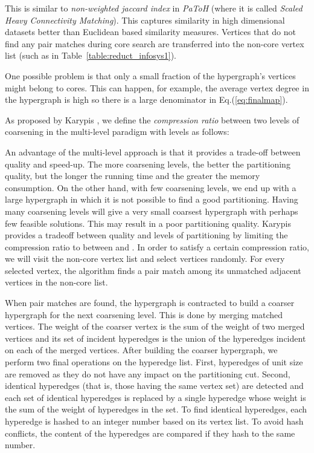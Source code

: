 \documentclass[twocolumn]{svjour3}          \smartqed
\begin{document}
This is similar to \textit{non-weighted jaccard index} in \textit{PaToH} (where it is called \emph{Scaled Heavy Connectivity Matching}). This captures similarity in high dimensional datasets better than Euclidean based similarity measures. Vertices that do not find any pair matches during core search are transferred into the non-core vertex list (such as  in Table~\ref{table:reduct_infosys1}).

One possible problem is that only a small fraction of the hypergraph's vertices might belong to cores. This can happen, for example, the average vertex degree in the hypergraph is high so there is a  large denominator in Eq.(\ref{eq:finalmap}). 

As proposed by Karypis \cite{karytech2002}, we define the \textit{compression ratio} between two levels of coarsening in the multi-level paradigm with  levels as follows:



An advantage of the multi-level approach is that it provides a trade-off between quality and speed-up. The more coarsening levels, the better the partitioning quality, but the longer the running time and the greater the memory consumption. On the other hand, with few coarsening levels, we end up with a large hypergraph in which it is not possible to find a good partitioning.  Having many coarsening levels will give a very small coarsest hypergraph with perhaps few feasible solutions.  This may result in a poor partitioning quality. Karypis \cite{karytech2002} provides a tradeoff between quality and levels of partitioning by limiting the compression ratio  to between  and  .  In order to satisfy a certain compression ratio, we will visit the non-core vertex list and select vertices randomly. For every selected vertex, the algorithm finds a pair match among its unmatched adjacent vertices in the non-core list.

When pair matches are found, the hypergraph is contracted to build a coarser hypergraph for the next coarsening level. This is done by merging matched vertices. The weight of the coarser vertex is the sum of the weight of two merged vertices and its set of incident hyperedges is the union of the hyperedges incident on each of the merged vertices. After building the coarser hypergraph, we perform two final operations on the hyperedge list. First, hyperedges of unit size are removed as they do not have any impact on the partitioning cut.  Second, identical hyperedges (that is, those having the same vertex set) are detected and each set of identical hyperedges is replaced by a single hyperedge whose weight is the sum of the weight of hyperedges in the set. To find identical hyperedges, each hyperedge is hashed to an integer number based on its vertex list.  To avoid hash conflicts, the content of the hyperedges are compared if they hash to the same number. 
\end{document}
